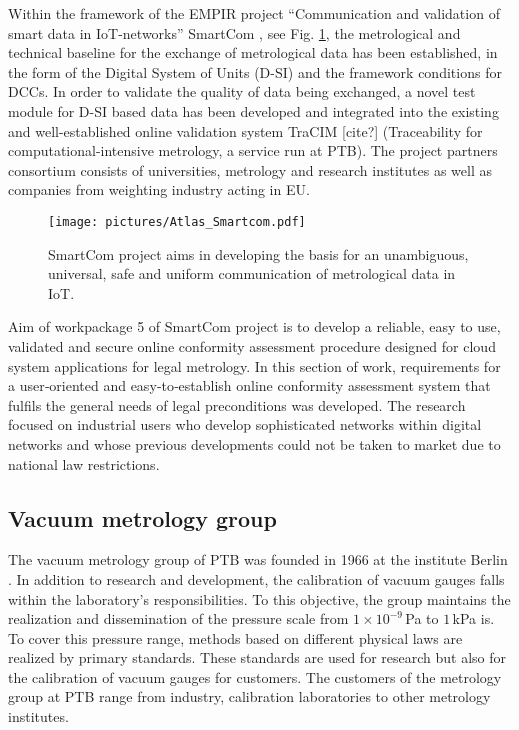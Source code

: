 \documentclass[3p,times,procedia]{elsarticle}
\begin{document}
Within the framework of the EMPIR project “Communication and validation of smart data in IoT-networks” SmartCom \cite{SmartCom}, see Fig. \ref{fig:SmartCom_logo}, the metrological and technical baseline for the exchange of metrological data has been established, in the form of the Digital System of Units (D-SI) and the framework conditions for DCCs. In order to validate the quality of data being exchanged, a novel test module for D-SI based data has been developed and integrated into the existing and well-established online validation system TraCIM [cite?] (Traceability for computational-intensive metrology, a service run at PTB). The project partners consortium consists of universities, metrology and research institutes as well as companies from weighting industry acting in EU. 

\begin{figure}
    \centering
    \texttt{[image: pictures/Atlas\_Smartcom.pdf]}
    \caption{SmartCom project aims in developing the basis for an unambiguous, universal, safe and uniform communication of metrological data in IoT. }
    \label{fig:SmartCom_logo}
\end{figure}

Aim of workpackage 5 of SmartCom project is to develop a reliable, easy to use, validated and secure online conformity assessment procedure designed for cloud system applications for legal metrology. In this section of work, requirements for a user‐oriented and easy‐to‐establish online conformity assessment system that fulfils the general needs of legal preconditions was developed. The research focused on industrial users who develop sophisticated networks within digital networks and whose previous developments could not be taken to market due to national law restrictions.

\subsection{Vacuum metrology group}

The vacuum metrology group of PTB was founded in 1966 at the institute
Berlin \cite{jou19, jou04}. In addition to research and development,
the calibration of vacuum gauges falls within the laboratory's
responsibilities. To this objective, the group maintains the
realization and dissemination of the pressure scale from
$1\times10^{-9}\,$Pa to $1\,$kPa is. To cover this pressure
range, methods based on different physical laws are
realized by primary standards. These standards are used for research
but also for the calibration of vacuum gauges for customers. The customers
of the metrology group at PTB range from industry, calibration laboratories
to other metrology institutes.
\end{document}
